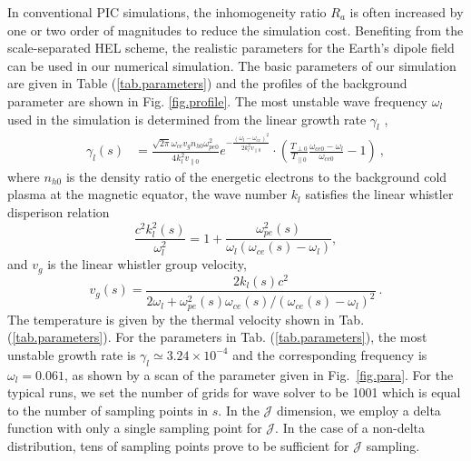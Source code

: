 In conventional PIC simulations, the inhomogeneity ratio $R_a$ is often increased by one or two order of magnitudes to reduce the simulation cost.
Benefiting from the scale-separated HEL  scheme,
 the realistic parameters for the Earth's dipole field
can be used in our numerical simulation.
The basic parameters 
of our simulation 
are given in Table (\ref{tab.parameters})
and the profiles of the background parameter are shown in Fig. \ref{fig.profile}.
The most unstable wave frequency $\omega_l$ used in the simulation 
 is determined from the linear growth rate  $\gamma_l$ \cite{gary_1993},
\begin{equation}
\begin{aligned}
    \gamma_l(s) & =\frac{\sqrt{2 \pi} \omega_{ce} v_g n_{h0} \omega_{pe0}^2}{4 k_l^2 v_{ \| 0}} e^{-\frac{\left(\omega_l-\omega_{c e}\right)^2}{2 k_l^2 v_{ \| 0}}}
    \cdot \left( \frac{T_{\perp 0}}{T_{\| 0}} \frac{\omega_{c e 0}-\omega_l}{\omega_{c e 0}}-1\right)~,
    \end{aligned}
\end{equation}
where 
 $n_{h0}$ is the density ratio of the energetic electrons to the background cold plasma at the magnetic equator,
the wave number $k_l$ satisfies the linear whistler disperison relation
\begin{equation}
    \frac{c^2 k_l^2(s)}{\omega_l^2} = 1 + \frac{\omega_{pe}^2(s)}{\omega_l(\omega_{ce}(s)-\omega_l)},
\end{equation}
and $v_g$ is the linear whistler group velocity,
\begin{equation}
    v_g(s) = \frac{2k_l(s)c^2 }{2\omega_l + \omega_{pe}^2(s)\omega_{ce}(s)/(\omega_{ce}(s)-\omega_l)^2}~.
\end{equation}
The temperature is given by the thermal velocity shown in Tab. (\ref{tab.parameters}).
For the  parameters in Tab. (\ref{tab.parameters}), 
the most unstable 
growth rate is $\gamma_l \simeq 3.24\times 10^{-4}$
and the corresponding 
frequency is $\omega_l = 0.061$, as shown by a scan of the parameter given in Fig.~\ref{fig.para}.
For the typical runs, we set the number of grids for wave solver to be 1001
which is equal to  the number of sampling points in $s$.
In the $\mathcal{J}$ dimension, we employ a delta function with only a single sampling point for $\mathcal{J}$. In the case of a non-delta distribution, tens of sampling points prove to be sufficient for $\mathcal{J}$ sampling.
